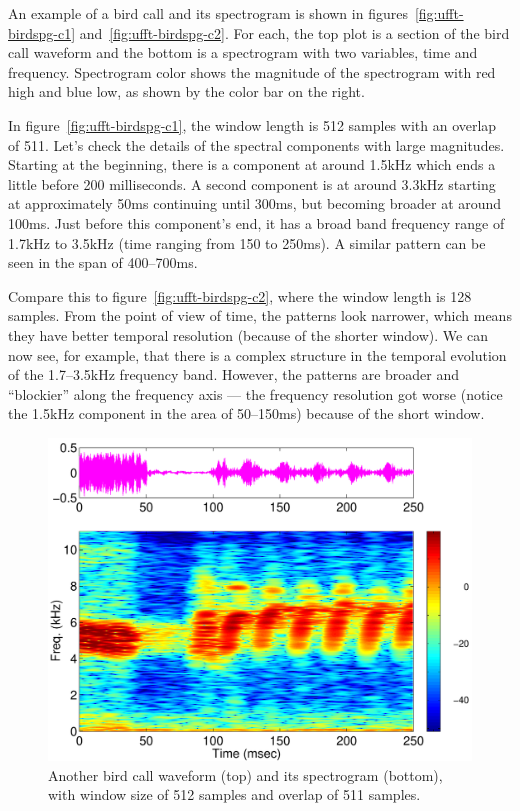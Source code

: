 An example of a bird call and its spectrogram is shown in
figures~\ref{fig:ufft-birdspg-c1} and~\ref{fig:ufft-birdspg-c2}. For
each, the top plot is a section of the bird call waveform and the
bottom is a spectrogram with two variables, time and
frequency. Spectrogram color shows the magnitude of the spectrogram
with red high and blue low, as shown by the color bar on the right.

In figure~\ref{fig:ufft-birdspg-c1}, the window length is 512 samples
with an overlap of 511. Let's check the details of the spectral
components with large magnitudes. Starting at the beginning, there is
a component at around 1.5kHz which ends a little before 200
milliseconds. A second component is at around 3.3kHz starting at
approximately 50ms continuing until 300ms, but becoming broader at
around 100ms. Just before this component's end, it has a broad band
frequency range of 1.7kHz to 3.5kHz (time ranging from 150 to
250ms). A similar pattern can be seen in the span of 400--700ms.

Compare this to figure~\ref{fig:ufft-birdspg-c2}, where the window
length is 128 samples. From the point of view of time, the patterns
look narrower, which means they have better temporal resolution
(because of the shorter window). We can now see, for example, that
there is a complex structure in the temporal evolution of the
1.7--3.5kHz frequency band. However, the patterns are broader and
``blockier'' along the frequency axis --- the frequency resolution got
worse (notice the 1.5kHz component in the area of 50--150ms) because
of the short window.

\begin{figure}[p]
\centerline{\includegraphics[height=0.4\textheight]{ch-fft/ufft_bluewing1am_spg512_511}}
\caption[Different bird call waveform and spectrogram; 512 sample
window, overlap 511]{Another bird call waveform (top) and its
  spectrogram (bottom), with window size of 512 samples and overlap of
  511 samples.\label{fig:ufft-birdspg-b1}}
\end{figure}

